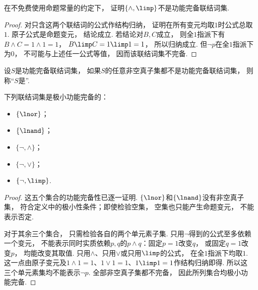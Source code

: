 \begin{example}
    在不免费使用命题常量的约定下，
    证明\(\{\land,\limp\}\)不是功能完备联结词集.
    \begin{proof}
        对只含这两个联结词的公式作结构归纳，
        证明在所有变元均取\(1\)时公式总取\(1\).
        原子公式是命题变元，
        结论成立.
        若结论对\(B,C\)成立，
        则全\(1\)指派下有\(B\land C=1\land1=1\)，
        \(B\limp C=1\limp1=1\)，
        所以归纳成立.
        但\(\neg p\)在全\(1\)指派下为\(0\)，
        不可能与上述任一公式等值，
        因而该联结词集不完备.
    \end{proof}
\end{example}

\begin{definition}
设\(S\)是功能完备联结词集，
如果\(S\)的任意非空真子集都不是功能完备联结词集，
则称“\(S\)是”.
\end{definition}

\begin{theorem}
下列联结词集是极小功能完备的：\begin{itemize}
	\item \(\{\lnor\}\)；
	\item \(\{\lnand\}\)；
	\item \(\{\neg,\land\}\)；
	\item \(\{\neg,\lor\}\)；
	\item \(\{\neg,\limp\}\).
\end{itemize}
    \begin{proof}
        这五个集合的功能完备性已逐一证明.
        \(\{\lnor\}\)和\(\{\lnand\}\)没有非空真子集，
        符合定义中的极小性条件；即使检验空集，
        空集也只能产生命题变元，
        不能表示否定.

        对于其余三个集合，
        只需检验各自的两个单元素子集.
        只用\(\neg\)得到的公式至多依赖一个变元，
        不能表示同时实质依赖\(p,q\)的\(p\land q\)：固定\(p=1\)改变\(q\)，
        或固定\(q=1\)改变\(p\)，
        均能改变其取值.
        只用\(\land\)、只用\(\lor\)或只用\(\limp\)的公式，
        在全\(1\)指派下均取\(1\).
        这一点由原子变元及\(1\land1=1\)、\(1\lor1=1\)、\(1\limp1=1\)作结构归纳即得.
        所以这三个单元素集均不能表示\(\neg p\).
        全部非空真子集都不完备，
        因此所列集合均极小功能完备.
    \end{proof}
\end{theorem}


